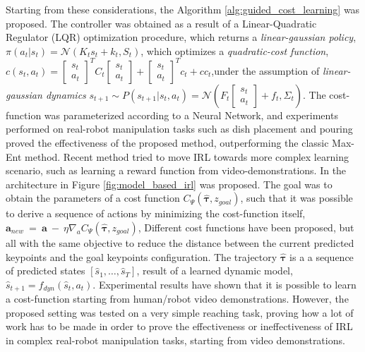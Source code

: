 \label{lqr} Starting from these considerations, the Algorithm \ref{alg:guided_cost_learning} was proposed. The controller was obtained as a result of a Linear-Quadratic Regulator (LQR) optimization procedure, which returns a \textit{linear-gaussian policy}, $\pi(a_{t}|s_{t}) = \mathcal{N}(K_{t}s_{t} + k_{t}, S_{t})$, which optimizes a \textit{quadratic-cost function}, $c(s_{t},a_{t}) = \begin{bmatrix} s_{t} \\ a_{t} \end{bmatrix}^{T}C_{t}\begin{bmatrix} s_{t} \\ a_{t} \end{bmatrix} + \begin{bmatrix} s_{t}\\a_{t}\end{bmatrix}^{T} c_{t} + cc_{t}$,under the assumption of \textit{linear-gaussian dynamics} $s_{t+1} \sim P(s_{t+1}|s_{t},a_{t}) = \mathcal{N}(F_{t}\begin{bmatrix}s_{t}\\ a_{t}\end{bmatrix} + f_{t}, \Sigma_{t})$. The cost-function was parameterized according to a Neural Network, and experiments performed on real-robot manipulation tasks such as dish placement and pouring proved the effectiveness of the proposed method, outperforming the classic Max-Ent method.
Recent method \cite{das2021model_based_irl_from_vd} tried to move IRL towards more complex learning scenario, such as learning a reward function from video-demonstrations. In \cite{das2021model_based_irl_from_vd} the architecture in Figure \ref{fig:model_based_irl} was proposed. The goal was to obtain the parameters of a cost function $C_{\Psi}(\hat{\boldsymbol{\tau}}, z_{goal})$, such that it was possible to derive a sequence of actions by minimizing the cost-function itself, $\textbf{a}_{new} \ = \ \textbf{a} \ - \ \eta \nabla_{a} C_{\Psi}(\hat{\boldsymbol{\tau}}, z_{goal})$, Different cost functions have been proposed, but all with the same objective to reduce the distance between the current predicted keypoints and the goal keypoints configuration. The trajectory $\hat{\boldsymbol{\tau}}$ is a a sequence of predicted states $[\hat{s}_{1}, \dots, \hat{s}_{T}]$, result of a learned dynamic model, $\hat{s}_{t+1} = f_{dyn}(\hat{s}_{t}, a_{t})$. Experimental results have shown that it is possible to learn a cost-function starting from human/robot video demonstrations. However, the proposed setting was tested on a very simple reaching task, proving how a lot of work has to be made in order to prove the effectiveness or ineffectiveness of IRL in complex real-robot manipulation tasks, starting from video demonstrations.
